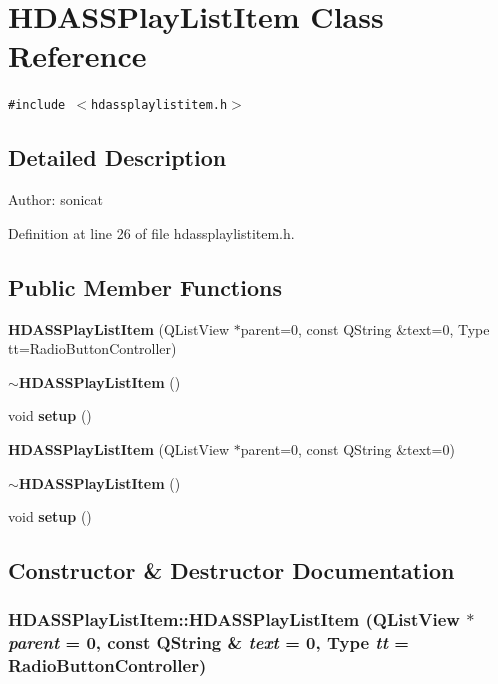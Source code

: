 \section{HDASSPlay\-List\-Item Class Reference}
\label{classHDASSPlayListItem}
{\tt \#include $<$hdassplaylistitem.h$>$}



\subsection{Detailed Description}
\begin{Desc}
\item[Author:]sonicat \end{Desc}




Definition at line 26 of file hdassplaylistitem.h.\subsection*{Public Member Functions}
\begin{CompactItemize}
\item 
{\bf HDASSPlay\-List\-Item} (QList\-View $\ast$parent=0, const QString \&text=0, Type tt=Radio\-Button\-Controller)
\item 
{\bf $\sim$HDASSPlay\-List\-Item} ()
\item 
void {\bf setup} ()
\item 
{\bf HDASSPlay\-List\-Item} (QList\-View $\ast$parent=0, const QString \&text=0)
\item 
{\bf $\sim$HDASSPlay\-List\-Item} ()
\item 
void {\bf setup} ()
\end{CompactItemize}


\subsection{Constructor \& Destructor Documentation}
\subsubsection{\setlength{\rightskip}{0pt plus 5cm}HDASSPlay\-List\-Item::HDASSPlay\-List\-Item (QList\-View $\ast$ {\em parent} = 0, const QString \& {\em text} = 0, Type {\em tt} = Radio\-Button\-Controller)}\label{classHDASSPlayListItem_HDASSPlayListItema0}




